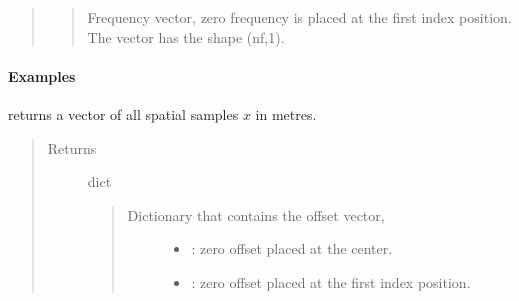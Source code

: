 \documentclass[letterpaper,10pt,english]{sphinxmanual}
\begin{document}
\begin{fulllineitems}
\begin{fulllineitems}
\begin{quote}
\begin{description}
\begin{quote}
Frequency vector, zero frequency is placed at the first index position. The vector has the shape (nf,1).
\end{quote}

\end{description}\end{quote}
\paragraph{Examples}

%
\begin{sphinxVerbatim}[commandchars=\\\{\}]
     
\end{sphinxVerbatim}

\end{fulllineitems}


\begin{fulllineitems}
\label{\detokenize{Wavefield_NRM_p_w:Wavefield_NRM_p_w.Wavefield_NRM_p_w.Xvec}}
returns a vector of all spatial samples \(x\) in metres.
\begin{quote}\begin{description}
\item[{Returns}] \leavevmode
dict
\begin{quote}
\begin{description}
\item[{Dictionary that contains the offset vector,}] \leavevmode\begin{itemize}
\item {} 
: zero offset placed at the center.

\item {} 
: zero offset placed at the first index position.

\end{itemize}


\end{description}
\end{quote}
\end{description}
\end{quote}
\end{fulllineitems}
\end{fulllineitems}
\end{document}

